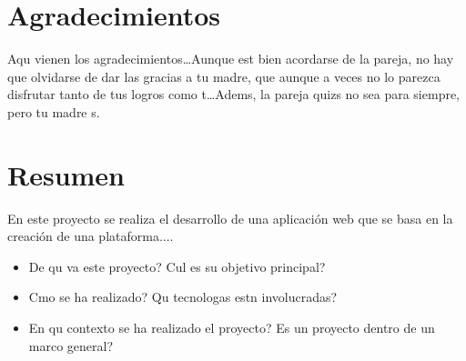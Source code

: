 \documentclass[a4paper, 12pt]{book}
\begin{document}
\newpage
\mbox{}
\thispagestyle{empty} %





\chapter*{Agradecimientos}

Aqu vienen los agradecimientos\ldots Aunque est bien acordarse de la pareja,
no hay que olvidarse de dar las gracias a tu madre, que aunque a veces no lo 
parezca disfrutar tanto de tus logros como t\ldots Adems, la pareja quizs
no sea para siempre, pero tu madre s.


\chapter*{Resumen}

En este proyecto se realiza el desarrollo de una aplicaci\'on web que se basa en la creaci\'on de una plataforma....

\begin{itemize}
  \item De qu va este proyecto? Cul es su objetivo principal?
  \item Cmo se ha realizado? Qu tecnologas estn involucradas?
  \item En qu contexto se ha realizado el proyecto? Es un proyecto
dentro de un marco general?
\end{itemize}
\end{document}

